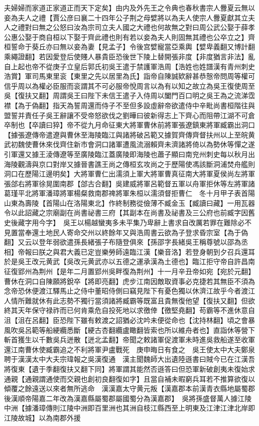 夫婦婦而家道正家道正而天下定矣】由内及外先王之令典也春秋書宗人釁夏云無以妾為夫人之禮【賈公彦曰襄二十四年公子荆之母嬖將以為夫人使宗人釁夏獻其立夫人之禮對曰無之公怒曰汝為宗司立夫人國之大禮也何故無之對曰周公武公娶于薛孝公惠公娶于商自桓以下娶于齊此禮也則有若以妾為夫人則固無其禮也公卒立之】齊桓誓命于葵丘亦曰無以妾為妻【見孟子】令後宫嬖寵當亞乘輿【嬖卑義翻又博計翻乘繩證翻】若因愛登后使賤人暴貴臣恐後世下陵上替開張非度【非度猶言非法】亂自上起也帝不從庚子立皇后郭氏初吳王遣于禁護軍浩周【浩姓也姓譜漢有青州刺史浩賞】軍司馬東里衮【東里之先以居里為氏】詣帝自陳誠欵辭甚恭慤帝問周等權可信乎周以為權必臣服而衮謂其不可必服帝悅周言以為有以知之故立為吳王復使周至吳【復扶又翻】周謂吳王曰陛下未信王遣子入侍周以闔門百口明之吳王為之流涕霑襟【為于偽翻】指天為誓周還而侍子不至但多設虛辭帝欲遣侍中辛毗尚書桓階往與盟誓并責任子吳王辭讓不受帝怒欲伐之劉曄曰彼新得志上下齊心而阻帶江湖不可倉卒制也【卒讀曰猝】帝不從九月命征東大將軍曹休前將軍張遼鎮東將軍臧霸出洞口【據張遼傳帝遣遼與曹休至海陵臨江與諸將破呂範又據賀齊傳齊督扶州以上至皖黄武初魏使曹休來伐齊住新市會洞口諸軍遭風流溺賴齊未濟諸將倚以為勢休等憚之遂引軍還又據王淩傳遼等至廣陵臨江蓋廣陵即海陵也蕭子顯曰南兖州刺史每以秋月出海陵觀濤與京口對岸又據晉書譙王尚之傳桓玄攻尚之于歷陽使馮該斷洞浦焚舟艦則洞口在歷陽江邊明矣】大將軍曹仁出濡須上軍大將軍曹真征南大將軍夏侯尚左將軍張郃右將軍徐晃圍南郡【郃古合翻】吳建威將軍呂範督五軍以舟軍拒休等左將軍諸葛瑾平北將軍潘璋將軍楊粲救南郡禆將軍朱桓以濡須督拒曹仁　冬十月甲子表首陽山東為壽陵【首陽山在洛陽東北】作終制務從儉薄不臧金玉【臧讀曰藏】一用瓦器令以此詔藏之宗廟副在尚書祕書三府【其副本在尚書及祕書及三公府也前臧字因舊史後藏字用今字】　吳王以楊越蠻夷多未平集乃卑辭上書求自改厲若罪在難除必不見置當奉還土地民人寄命交州以終餘年又與浩周書云欲為子登求昏宗室【為于偽翻】又云以登年弱欲遣孫長緒張子布隨登俱來【孫邵字長緒吳王稱尊號以邵為丞相】帝報曰朕之與君大義已定豈樂勞師遠臨江漢【樂音洛】若登身朝到夕召兵還耳於是吳王改元黄武【吳改元黄武亦以五德之運承漢為土德也】臨江拒守帝自許昌南征復郢州為荆州【是年二月置郢州吳畔復為荆州】十一月辛丑帝如宛【宛於元翻】曹休在洞口自陳願將銳卒【將即亮翻】虎步江南因敵取資事必克捷若其無臣不須為念帝恐休便渡江驛馬止之侍中董昭侍側曰竊見陛下有憂色獨以休濟江故乎今者渡江人情所難就休有此志勢不獨行當須諸將臧霸等既富且貴無復他望【復扶又翻】但欲終其天年保守禄祚而已何肯乘危自投死地以求徼倖【徼堅堯翻】苟霸等不進休意自沮【沮在呂翻】臣恐陛下雖有敕渡之詔猶必沈吟未便從命也【沈持林翻】頃之會暴風吹吳呂範等船綆纜悉斷【綆古杏翻纜盧瞰翻皆索也所以維舟者也】直詣休等營下斬首獲生以千數吳兵迸散【迸北孟翻】帝聞之敕諸軍促渡軍未時進吳救船遂至收軍還江南曹休使臧霸追之不利將軍尹盧戰死　庚申晦日有食之　吳王使太中大夫鄭泉聘于漢漢太中大夫宗瑋報之吳漢復通　漢主聞魏師大出遺陸遜書曰賊今已在江漢吾將復東【遺于季翻復扶又翻下同】將軍謂其能然否遜答曰但恐軍新破創夷未復始求通親【通親謂通使而交親也創初良翻復如字】且當自補未暇窮兵耳若不推算欲復以傾覆之餘遠送以來者無所逃命　漢漢嘉太守黄元叛【漢嘉郡本前漢青衣縣地屬蜀郡後漢順帝陽嘉二年改為漢嘉縣屬蜀郡屬國蜀分為漢嘉郡】　吳將孫盛督萬人據江陵中洲【據潘璋傳則江陵中洲即百里洲也其洲自枝江縣西至上明東及江津江津北岸即江陵故城】以為南郡外援

